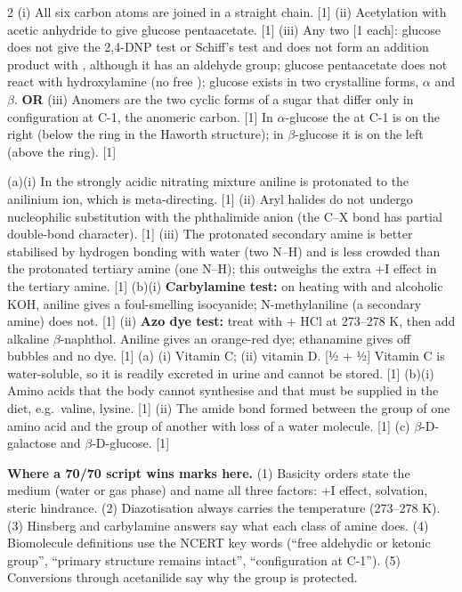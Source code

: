 \documentclass[10pt,a4paper]{extarticle}
\newcommand{\mk}[1]{{\scriptsize\color{black!55}[#1]}}
\begin{document}
\begin{multicols}{2}
\An (i) All six carbon atoms are joined in a straight chain. \mk{1}\nl
(ii) Acetylation with acetic anhydride to give glucose pentaacetate. \mk{1}\nl
(iii) Any two \mk{1 each}: glucose does not give the 2,4-DNP test or Schiff's test and does not form an addition product with , although it has an aldehyde group; glucose pentaacetate does not react with hydroxylamine (no free ); glucose exists in two crystalline forms, $\alpha$ and $\beta$.\nl
\textbf{OR} (iii) Anomers are the two cyclic forms of a sugar that differ only in configuration at C-1, the anomeric carbon. \mk{1} In $\alpha$-glucose the  at C-1 is on the right (below the ring in the Haworth structure); in $\beta$-glucose it is on the left (above the ring). \mk{1}

\An (a)(i) In the strongly acidic nitrating mixture aniline is protonated to the anilinium ion, which is meta-directing. \mk{1}\nl
(ii) Aryl halides do not undergo nucleophilic substitution with the phthalimide anion (the C--X bond has partial double-bond character). \mk{1}\nl
(iii) The protonated secondary amine is better stabilised by hydrogen bonding with water (two N--H) and is less crowded than the protonated tertiary amine (one N--H); this outweighs the extra +I effect in the tertiary amine. \mk{1}\nl
(b)(i) \textbf{Carbylamine test:} on heating with  and alcoholic KOH, aniline gives a foul-smelling isocyanide; N-methylaniline (a secondary amine) does not. \mk{1}\nl
(ii) \textbf{Azo dye test:} treat with  + HCl at 273--278 K, then add alkaline $\beta$-naphthol. Aniline gives an orange-red dye; ethanamine gives off  bubbles and no dye. \mk{1}
\An (a) (i) Vitamin C; (ii) vitamin D. \mk{½ + ½} Vitamin C is water-soluble, so it is readily excreted in urine and cannot be stored. \mk{1}\nl
(b)(i) Amino acids that the body cannot synthesise and that must be supplied in the diet, e.g.\ valine, lysine. \mk{1}\nl
(ii) The amide bond  formed between the  group of one amino acid and the  group of another with loss of a water molecule. \mk{1}\nl
(c) $\beta$-D-galactose and $\beta$-D-glucose. \mk{1}
\end{multicols}
\begin{tcolorbox}[enhanced,colback=tipY,colframe=tipYframe,boxrule=0.5pt,arc=1.5pt,left=4pt,right=4pt,top=2pt,bottom=2pt,before skip=4pt]
\footnotesize\textbf{Where a 70/70 script wins marks here.} (1) Basicity orders state the medium (water or gas phase) and name all three factors: +I effect, solvation, steric hindrance. (2) Diazotisation always carries the temperature (273--278 K). (3) Hinsberg and carbylamine answers say what each class of amine does. (4) Biomolecule definitions use the NCERT key words (``free aldehydic or ketonic group'', ``primary structure remains intact'', ``configuration at C-1''). (5) Conversions through acetanilide say why the  group is protected.
\end{tcolorbox}
\end{document}

